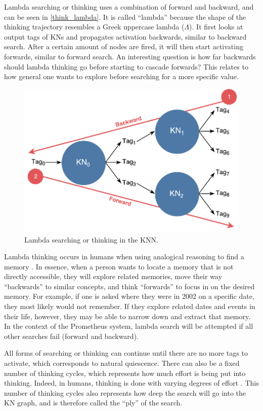 \documentclass[titlepage,11pt]{article}
\begin{document}
Lambda searching or thinking uses a combination of forward and backward, and can be seen in \autoref{think_lambda}. It is called ``lambda'' because the shape of the thinking trajectory resembles a Greek uppercase lambda ($\Lambda$). It first looks at output tags of KNs and propagates activation backwards, similar to backward search. After a certain amount of nodes are fired, it will then start activating forwards, similar to forward search. An interesting question is how far backwards should lambda thinking go before starting to cascade forwards? This relates to how general one wants to explore before searching for a more specific value.

\begin{figure}[!htb]
	\includegraphics[width=\columnwidth]{figures/lambda_search.pdf}
	\caption{Lambda searching or thinking in the KNN.}
	\label{think_lambda}
\end{figure}

Lambda thinking occurs in humans when using analogical reasoning to find a memory \cite{vybihal-lambda}. In essence, when a person wants to locate a memory that is not directly accessible, they will explore related memories, move their way ``backwards'' to similar concepts, and think ``forwards'' to focus in on the desired memory. For example, if one is asked where they were in 2002 on a specific date, they most likely would not remember. If they explore related dates and events in their life, however, they may be able to narrow down and extract that memory. In the context of the Prometheus system, lambda search will be attempted if all other searches fail (forward and backward).

All forms of searching or thinking can continue until there are no more tags to activate, which corresponds to natural quiescence. There can also be a fixed number of thinking cycles, which represents how much effort is being put into thinking. Indeed, in humans, thinking is done with varying degrees of effort \cite{thinking}. This number of thinking cycles also represents how deep the search will go into the KN graph, and is therefore called the ``ply'' of the search.
\end{document}
